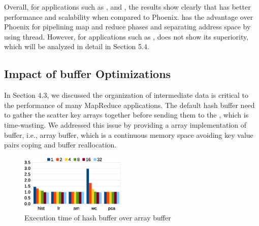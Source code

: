 Overall, for applications such as ,  and , the results show clearly that \myds has better performance and scalability when compared to Phoenix.
\myds has the advantage over Phoenix for pipelining map and reduce phases and separating address space by using \myth thread. 
However, for applications such as , \myds does not show its superiority, which will be analyzed in detail in Section 5.4.

\subsection{Impact of buffer Optimizations}
In Section 4.3, we discussed the organization of intermediate data is critical to the performance of many MapReduce applications.
The default hash buffer need to gather the scatter key arrays together before sending them to the , which is time-wasting.
We addressed this issue by providing a array implementation of buffer, i.e., array buffer, which is a continuous memory space avoiding key value pairs coping and buffer reallocation.

\begin{figure}[!h!t]  
	\centering
	\includegraphics[width=0.45\textwidth]{eps/smr_diff_buffer.eps}
	\caption{Execution time of hash buffer over array buffer}
	\label{fig:smr:diff:buffer}
\end{figure}


